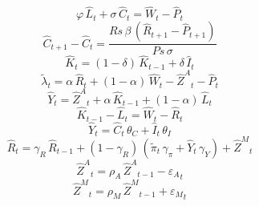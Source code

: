 \begin{dmath}
{{\varphi}}\, {{\hat{L}}}_{t}+{{\sigma}}\, {{\hat{C}}}_{t}={{\hat{W}}}_{t}-{{\hat{P}}}_{t}
\end{dmath}
\begin{dmath}
{{\hat{C}}}_{t+1}-{{\hat{C}}}_{t}=\frac{{Rs}\, {{\beta}}\, \left({{\hat{R}}}_{t+1}-{{\hat{P}}}_{t+1}\right)}{{Ps}\, {{\sigma}}}
\end{dmath}
\begin{dmath}
{{\hat{K}}}_{t}=\left(1-{{\delta}}\right)\, {{\hat{K}}}_{t-1}+{{\delta}}\, {{\hat{I}}}_{t}
\end{dmath}
\begin{dmath}
{{\tilde{\lambda}}}_{t}={{\alpha}}\, {{\hat{R}}}_{t}+\left(1-{{\alpha}}\right)\, {{\hat{W}}}_{t}-{{\hat{Z}^A}}_{t}-{{\hat{P}}}_{t}
\end{dmath}
\begin{dmath}
{{\hat{Y}}}_{t}={{\hat{Z}^A}}_{t}+{{\alpha}}\, {{\hat{K}}}_{t-1}+\left(1-{{\alpha}}\right)\, {{\hat{L}}}_{t}
\end{dmath}
\begin{dmath}
{{\hat{K}}}_{t-1}-{{\hat{L}}}_{t}={{\hat{W}}}_{t}-{{\hat{R}}}_{t}
\end{dmath}
\begin{dmath}
{{\hat{Y}}}_{t}={{\hat{C}}}_{t}\, {{\theta_C}}+{{\hat{I}}}_{t}\, {{\theta_I}}
\end{dmath}
\begin{dmath}
{{\hat{R}}}_{t}={{\gamma_R}}\, {{\hat{R}}}_{t-1}+\left(1-{{\gamma_R}}\right)\, \left({{\tilde{\pi}}}_{t}\, {{\gamma_\pi}}+{{\hat{Y}}}_{t}\, {{\gamma_Y}}\right)+{{\hat{Z}^M}}_{t}
\end{dmath}
\begin{dmath}
{{\hat{Z}^A}}_{t}={{\rho_A}}\, {{\hat{Z}^A}}_{t-1}-{{\varepsilon_A}}_{t}
\end{dmath}
\begin{dmath}
{{\hat{Z}^M}}_{t}={{\rho_M}}\, {{\hat{Z}^M}}_{t-1}+{{\varepsilon_M}}_{t}
\end{dmath}
